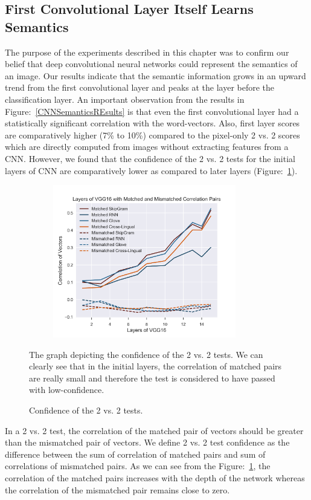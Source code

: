 \subsection{First Convolutional Layer Itself Learns Semantics }

The purpose of the experiments described in this chapter was to confirm our belief that deep convolutional neural networks could represent the semantics of an image. Our results indicate that the semantic information grows in an upward trend from the first convolutional layer and peaks at the layer before the classification layer. An important observation from the results in Figure:~\ref{CNNSemanticsREsults} is that even the first convolutional layer had a statistically significant correlation with the word-vectors. Also, first layer scores are comparatively higher (7\% to 10\%) compared to the pixel-only 2 vs. 2 scores which are directly computed from images without extracting features from a CNN. However, we found that the confidence of the 2 vs. 2 tests for the initial layers of CNN are comparatively lower as compared to later layers (Figure:~\ref{VGG16CONFIDENCE}).

\begin{figure}[t]
    \centering
    \begin{subfigure}[t]{0.49\textwidth}
        \includegraphics[width=8cm]{Figures/MATMIS}
    \end{subfigure}%
    \caption{Confidence of the 2 vs. 2 tests.}
    \label{VGG16CONFIDENCE}
    The graph depicting the confidence of the 2 vs. 2 tests. We can clearly see that in the initial layers, the correlation of matched pairs are really small and therefore the test is considered to have passed with low-confidence.
\end{figure}

In a 2 vs. 2 test, the correlation of the matched pair of vectors should be greater than the mismatched pair of vectors. We define 2 vs. 2 test confidence as the difference between the sum of correlation of matched pairs and sum of correlations of mismatched pairs. As we can see from the Figure:~\ref{VGG16CONFIDENCE}, the correlation of the matched pairs increases with the depth of the network whereas the correlation of the mismatched pair remains close to zero. 

